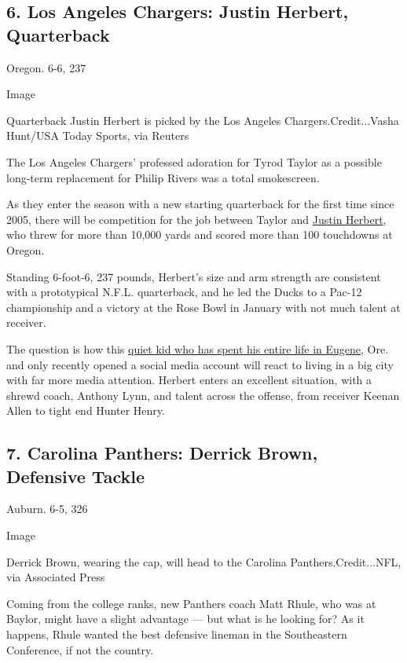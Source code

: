 \hypertarget{6-los-angeles-chargers-justin-herbert-quarterback}{%
\subsection{6. Los Angeles Chargers: Justin Herbert,
Quarterback}\label{6-los-angeles-chargers-justin-herbert-quarterback}}

Oregon. 6-6, 237

Image

Quarterback Justin Herbert is picked by the Los Angeles
Chargers.Credit...Vasha Hunt/USA Today Sports, via Reuters

The Los Angeles Chargers' professed adoration for Tyrod Taylor as a
possible long-term replacement for Philip Rivers was a total
smokescreen.

As they enter the season with a new starting quarterback for the first
time since 2005, there will be competition for the job between Taylor
and
\href{https://www.nytimes3xbfgragh.onion/article/justin-herbert.html}{Justin
Herbert}, who threw for more than 10,000 yards and scored more than 100
touchdowns at Oregon.

Standing 6-foot-6, 237 pounds, Herbert's size and arm strength are
consistent with a prototypical N.F.L. quarterback, and he led the Ducks
to a Pac-12 championship and a victory at the Rose Bowl in January with
not much talent at receiver.

The question is how this
\href{https://www.nytimes3xbfgragh.onion/article/justin-herbert.html}{quiet
kid who has spent his entire life in Eugene}, Ore. and only recently
opened a social media account will react to living in a big city with
far more media attention. Herbert enters an excellent situation, with a
shrewd coach, Anthony Lynn, and talent across the offense, from receiver
Keenan Allen to tight end Hunter Henry.

\hypertarget{7-carolina-panthers-derrick-brown-defensive-tackle}{%
\subsection{7. Carolina Panthers: Derrick Brown, Defensive
Tackle}\label{7-carolina-panthers-derrick-brown-defensive-tackle}}

Auburn. 6-5, 326

Image

Derrick Brown, wearing the cap, will head to the Carolina
Panthers.Credit...NFL, via Associated Press

Coming from the college ranks, new Panthers coach Matt Rhule, who was at
Baylor, might have a slight advantage --- but what is he looking for? As
it happens, Rhule wanted the best defensive lineman in the Southeastern
Conference, if not the country.

